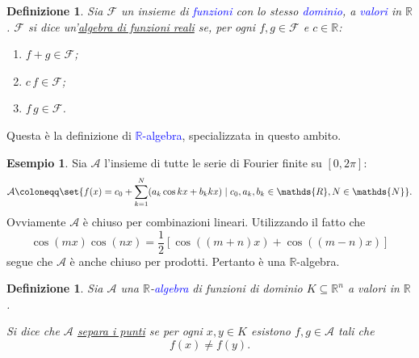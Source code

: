 \documentclass[10pt]{book}
\let\sin\relax %
\DeclareMathOperator{\sin}{sen}
\newcommand{\1}{\mathds{1}}
\newcommand{\R}{\mathds{R}}
\newcommand{\N}{\mathds{N}}
\theoremstyle{definition}%
\newtheorem{esempio}[thm]{Esempio}
\theoremstyle{plain}
\newtheorem{definizione}[thm]{Definizione}
\theoremstyle{remark}
\renewcommand{\href}[2]{\textcolor{blue}{#2}}
\begin{document}
\begin{definizione}
Sia \(\mathcal{F}\) un insieme di \href{../../../../../org/roam/20250202170607-classe_relazione_binaria.org}{funzioni} con lo stesso \href{../../../../../org/roam/20250202173528-dominio_range_e_campo_di_una_classe_relazione.org}{dominio}, a \href{../../../../../org/roam/20250202173528-dominio_range_e_campo_di_una_classe_relazione.org}{valori} in \(\R\). \(\mathcal{F}\) si dice un'\uline{algebra di funzioni reali} se, per ogni \(f,g \in \mathcal{F}\) e \(c \in \R\):
\begin{enumerate}
\item \(f+g \in \mathcal{F}\);
\item \(c\,f \in \mathcal{F}\);
\item \(f\,g \in \mathcal{F}\).
\end{enumerate}
\end{definizione}

Questa è la definizione di \href{../../../../../org/roam/20250110175552-algebra_su_un_campo.org}{\(\R\)-algebra}, specializzata in questo ambito.

\begin{esempio}
Sia \(\mathcal{A}\) l'insieme di tutte le serie di Fourier finite su \([0,2\pi]\):
\begin{equation*}
\mathcal{A} \coloneqq \set{f(x) = c_{0}+ \sum_{k=1}^{N} (a_{k}\cos kx + b_{k}\sin kx)\mid c_{0},a_{k},b_{k} \in \R, N \in\N}.
\end{equation*}
Ovviamente \(\mathcal{A}\) è chiuso per combinazioni lineari. Utilizzando il fatto che
\begin{equation*}
\cos(mx)\cos(nx) = \frac{1}{2}\left[\cos((m+n)x) + \cos((m-n)x)\right]
\end{equation*}
segue che \(\mathcal{A}\) è anche chiuso per prodotti. Pertanto è una \(\R\)-algebra.
\end{esempio}
\begin{definizione}
Sia \(\mathcal{A}\) una \(\R\)-\href{../../../../../org/roam/20250110175552-algebra_su_un_campo.org}{algebra} di funzioni di dominio \(K \subseteq \R^{n}\) a valori in \(\R\).

Si dice che \(\mathcal{A}\) \uline{separa i punti} se per ogni \(x,y \in K\) esistono \(f,g \in \mathcal{A}\) tali che
\begin{equation*}
f(x) \neq f(y).
\end{equation*}
\end{definizione}
\end{document}
